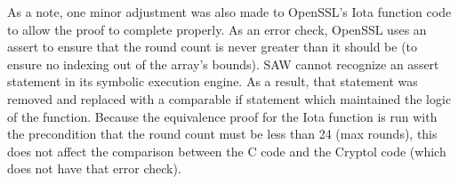 As a note, one minor adjustment was also made to OpenSSL's Iota function code to allow the proof to complete properly.
As an error check, OpenSSL uses an assert to ensure that the round count is never greater than it should be (to ensure no indexing out of the array's bounds).
SAW cannot recognize an assert statement in its symbolic execution engine.
As a result, that statement was removed and replaced with a comparable if statement which maintained the logic of the function.
Because the equivalence proof for the Iota function is run with the precondition that the round count must be less than 24 (max rounds), this does not affect the comparison between the C code and the Cryptol code (which does not have that error check).